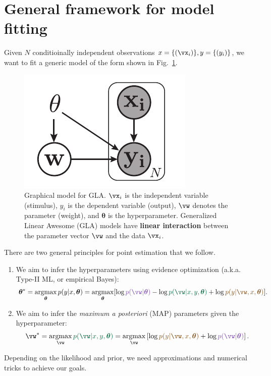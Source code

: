 \documentclass{article}
\newcounter{ct}
\DeclareMathOperator*{\argmax}{\rm argmax}
\newcommand{\weight}{\vw}
\newcommand{\hyp}{\bm{\theta}}
\newcommand{\likelihood}{\ensuremath{\textcolor{goldenbrown}{p(y|\weight,x,\hyp)}}}
\newcommand{\prior}{\ensuremath{\textcolor{amethyst}{p(\weight|\hyp)}}}
\newcommand{\posterior}{\textcolor{cadmiumgreen}{p(\weight|x,y,\hyp)}}
\begin{document}
\section{General framework for model fitting}
Given $N$ conditioinally independent observations $x = \{(\vx_i)\}, y = \{(y_i)\}$, we want to fit a generic model of the form shown in Fig.~\ref{fig:graphical_model}.
\begin{figure}
\centering
\includegraphics{GLA_graphical_model}
\caption{Graphical model for GLA.
    $\vx_i$ is the independent variable (stimulus), $y_i$ is the dependent variable (output),
    $\weight$ denotes the parameter (weight), and $\hyp$ is the hyperparameter.
    Generalized Linear Awesome (GLA) models have \textbf{linear interaction}
    between the parameter vector $\weight$ and the data $\vx_i$.
}
\label{fig:graphical_model}
\end{figure}
There are two general principles for point estimation that we follow.
\begin{enumerate}
    \item We aim to infer the hyperparameters using evidence optimization (a.k.a. Type-II ML, or empirical Bayes):
	\begin{align}
	    \hyp^\ast = \argmax_{\hyp} p(y|x,\hyp)
		= \argmax_{\hyp} 
		[
		\log\prior - \log\posterior + \log\likelihood
		].
	\end{align}
    \item We aim to infer the \textit{maximum a posteriori} (MAP) parameters given the hyperparameter:
	\begin{align}
	    \weight^\ast = \argmax_{\weight} \posterior =
		\argmax_{\weight} \left[ \log\likelihood + \log\prior \right].
	\end{align}
\end{enumerate}
Depending on the likelihood and prior, we need approximations and numerical tricks to achieve our goals.
\end{document}
